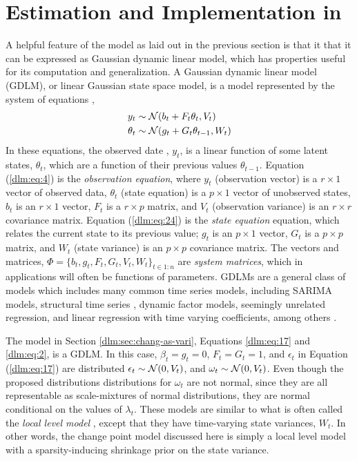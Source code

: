 \section{Estimation and Implementation in \Stan{}}
\label{dlm:sec:estimation}

A helpful feature of the model as laid out in the previous section is that it that it can be expressed as Gaussian dynamic linear model, which has properties useful for its computation and generalization.
A Gaussian dynamic linear model (GDLM), or linear Gaussian state space model, is a model represented by the system of equations \parencites{DurbinKoopman2012}{WestHarrison1997}{PetrisPetroneEtAl2009}[Ch 6]{ShumwayStoffer2010},
\begin{align}
  \label{dlm:eq:4}
  y_{t} &\sim \mathcal{N}\mathopen{}\left(b_{t} + F_{t} \theta_{t}, V_{t}\right)\mathclose{} \\
  \label{dlm:eq:24}
  \theta_{t} &\sim \mathcal{N}\mathopen{}\left(g_{t} + G_{t} \theta_{t - 1}, W_{t}\right)\mathclose{} 
\end{align}
In these equations, the observed date , $y_{t}$, is a linear function of some latent states, $\theta_{t}$, which are a function of their previous values $\theta_{t-1}$.
Equation (\ref{dlm:eq:4}) is the \textit{observation equation}, where $y_{t}$ (observation vector) is a $r \times 1$ vector of observed data, $\theta_{t}$ (state equation) is a $p \times 1$ vector of unobserved states, $b_{t}$ is an $r \times 1$ vector, $F_{t}$ is a $r \times p$ matrix, and $V_{t}$ (observation variance) is an $r \times r$ covariance matrix.
Equation (\ref{dlm:eq:24}) is the \textit{state equation} equation, which relates the current state to its previous value; $g_{t}$ is an $p \times 1$ vector, $G_{t}$ is a $p \times p$ matrix, and $W_{t}$ (state variance) is an $p \times p$ covariance matrix.
The vectors and matrices, $\Phi = \{ b_{t}, g_{t}, F_{t}, G_{t}, V_{t}, W_{t} \}_{t \in 1:n}$ are \textit{system matrices}, which in applications will often be functions of parameters.
GDLMs are a general class of models which includes many common time series models, including SARIMA models, structural time series \parencite{Harvey1989}, dynamic factor models, seemingly unrelated regression, and linear regression with time varying coefficients, among others \parencite[Ch. 3]{DurbinKoopman2012}. 

The model in Section \ref{dlm:sec:chang-as-vari}, Equations \eqref{dlm:eq:17} and \eqref{dlm:eq:2}, is a GDLM.
In this case, $\beta_{t} = g_{t} = 0$, $F_{t} = G_{t} = 1$, and $\epsilon_{t}$ in Equation (\ref{dlm:eq:17}) are distributed $\epsilon_{t} \sim \mathcal{N}\mathopen{}\left(0, V_{t}\right)\mathclose{}$, and $\omega_{t} \sim \mathcal{N}\mathopen{}\left(0, V_{t}\right)\mathclose{}$.
Even though the proposed distributions distributions for $\omega_{t}$ are not normal, since they are all representable as scale-mixtures of normal distributions, they are normal conditional on the values of $\lambda_{t}$.%
These models are similar to what is often called the \textit{local level model} \parencite[Ch 2.]{DurbinKoopman2012}, except that they have time-varying state variances, $W_{t}$.
In other words, the change point model discussed here is simply a local level model with a sparsity-inducing shrinkage prior on the state variance.


